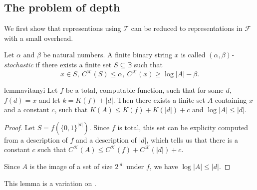 \documentclass{style/llncs}
\newcommand{\T}{\mathscr T}
\newcommand{\F}{\mathscr F}
\newcommand{\K}{\mathscr K}
\newcommand{\B}{\mathbb B}
\begin{document}
\subsection{The problem of depth}

We first show that representions using $\T$ can be reduced to representations in $\F$ with a small overhead.

\begin{definition}
  Let $\alpha$ and $\beta$ be natural numbers. A finite binary string $x$ is called \emph{$(\alpha,\beta)$-stochastic} if there exists a finite set $S\subseteq\B$ such that 
  \[
  x\in S,~C^\K(S)\le\alpha,~C^\K(x)\ge\log|A|-\beta.
\]
\end{definition}

\begin{restatable}{lemma}{vitanyi}
Let $f$ be a total, computable function, such that for some $d$, $f(d) = x$ and let $k = K(f) + |d|$. Then there exists a finite set $A$ containing $x$ and a constant $c$, such that $K(A) \leq K(f) + K(|d|) + c$ and $\log |A| \leq |d|$.\label{lemma:total-to-sets}
\end{restatable}
\begin{proof}
Let $S = f\left(\{0,1\}^{|d|}\right)$. Since $f$ is total, this set can be explicity computed from a description of $f$ and a description of $|d|$, which tells us that there is a constant $c$ such that $C^\K(A) \leq C^\K(f) + C^\K(|d|) + c$. 

Since $A$ is the image of a set of size $2^{|d|}$ under $f$, we have $\log |A| \leq |d|$.
\end{proof}
\noindent This lemma is a variation on \cite[Lemma~7.2]{vitanyi2004meaningful}. 
\end{document}
